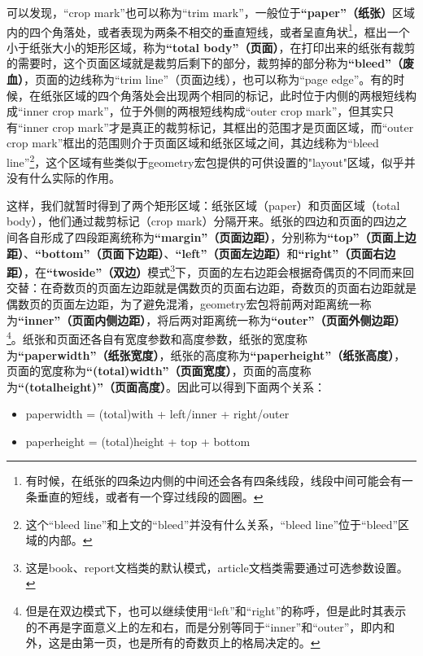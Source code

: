 ﻿\documentclass{article}
\begin{document}
可以发现，``crop mark''也可以称为``trim mark''，一般位于\textbf{``paper''（纸张）}区域内的四个角落处，或者表现为两条不相交的垂直短线，或者呈直角状\footnote{有时候，在纸张的四条边内侧的中间还会各有四条线段，线段中间可能会有一条垂直的短线，或者有一个穿过线段的圆圈。}，框出一个小于纸张大小的矩形区域，称为\textbf{``total body''（页面）}，在打印出来的纸张有裁剪的需要时，这个页面区域就是裁剪后剩下的部分，裁剪掉的部分称为\textbf{``bleed''（废血）}，页面的边线称为``trim line''（页面边线），也可以称为``page edge''。有的时候，在纸张区域的四个角落处会出现两个相同的标记，此时位于内侧的两根短线构成``inner crop mark''，位于外侧的两根短线构成``outer crop mark''，但其实只有``inner crop mark''才是真正的裁剪标记，其框出的范围才是页面区域，而``outer crop mark''框出的范围则介于页面区域和纸张区域之间，其边线称为``bleed line''\footnote{这个``bleed line''和上文的``bleed''并没有什么关系，``bleed line''位于``bleed''区域的内部。}，这个区域有些类似于geometry宏包提供的可供设置的"layout"区域，似乎并没有什么实际的作用。

这样，我们就暂时得到了两个矩形区域：纸张区域（paper）和页面区域（total body），他们通过裁剪标记（crop mark）分隔开来。纸张的四边和页面的四边之间各自形成了四段距离统称为\textbf{``margin''（页面边距）}，分别称为\textbf{``top''（页面上边距）}、\textbf{``bottom''（页面下边距）}、\textbf{``left''（页面左边距）}和\textbf{``right''（页面右边距）}，在\textbf{``twoside''（双边）}模式\footnote{这是book、report文档类的默认模式，article文档类需要通过可选参数设置。}下，页面的左右边距会根据奇偶页的不同而来回交替：在奇数页的页面左边距就是偶数页的页面右边距，奇数页的页面右边距就是偶数页的页面左边距，为了避免混淆，geometry宏包将前两对距离统一称为\textbf{``inner''（页面内侧边距）}，将后两对距离统一称为\textbf{``outer''（页面外侧边距）}\footnote{但是在双边模式下，也可以继续使用``left''和``right''的称呼，但是此时其表示的不再是字面意义上的左和右，而是分别等同于``inner''和``outer''，即内和外，这是由第一页，也是所有的奇数页上的格局决定的。}。纸张和页面还各自有宽度参数和高度参数，纸张的宽度称为\textbf{``paperwidth''（纸张宽度）}，纸张的高度称为\textbf{``paperheight''（纸张高度）}，页面的宽度称为\textbf{``(total)width''（页面宽度）}，页面的高度称为\textbf{``(totalheight)''（页面高度）}。因此可以得到下面两个关系：
\begin{itemize}
    \item paperwidth = (total)with + left/inner + right/outer
    \item paperheight = (total)height + top + bottom
\end{itemize}
\end{document}
